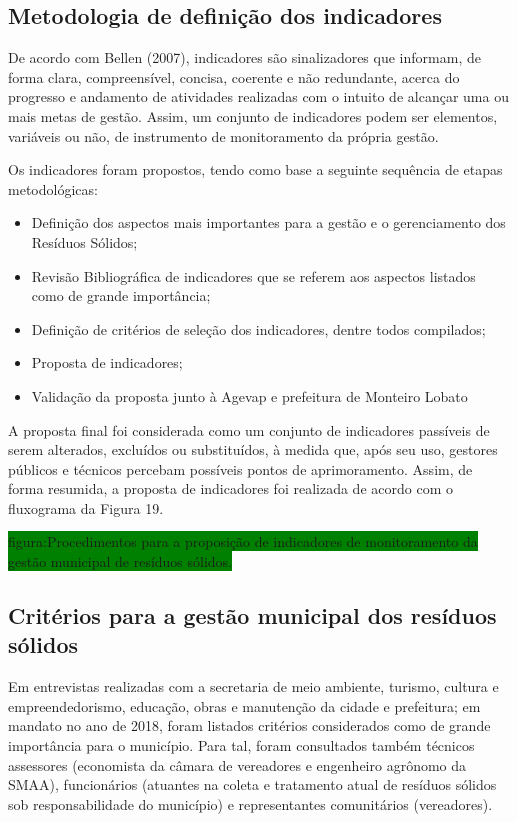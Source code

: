 	
	\subsection{Metodologia de definição dos indicadores}
	De acordo com Bellen (2007), indicadores são sinalizadores que informam, de forma clara, compreensível, concisa, coerente e não redundante, acerca do progresso e andamento de atividades realizadas com o intuito de alcançar uma ou mais metas de gestão. Assim, um conjunto de indicadores podem ser elementos, variáveis ou não, de instrumento de monitoramento da própria gestão.
	
	Os indicadores foram propostos, tendo como base a seguinte sequência de etapas metodológicas:
	
	\begin{itemize}
		\item Definição dos aspectos mais importantes para a gestão e o
		gerenciamento dos Resíduos Sólidos;
		\item Revisão Bibliográfica de indicadores que se referem aos aspectos
	listados como de grande importância;
		\item Definição de critérios de seleção dos indicadores, dentre todos
	compilados;
		\item Proposta de indicadores;
		\item Validação da proposta junto à Agevap e prefeitura de Monteiro
	Lobato
	\end{itemize} 

	A proposta final foi considerada como um conjunto de indicadores passíveis de serem alterados, excluídos ou substituídos, à medida que, após seu uso, gestores públicos e técnicos percebam possíveis pontos de aprimoramento. Assim, de forma resumida, a proposta de indicadores foi realizada de acordo com o fluxograma da Figura 19.
	
	\colorbox{green}{figura:Procedimentos para a proposição de indicadores de monitoramento da gestão municipal de resíduos sólidos.}
	
	\subsection{Critérios para a gestão municipal dos resíduos sólidos}
	
	Em entrevistas realizadas com a secretaria de meio ambiente, turismo, cultura e empreendedorismo, educação, obras e manutenção da cidade e prefeitura; em mandato no ano de 2018, foram listados critérios considerados como de grande importância para o município. Para tal, foram consultados também técnicos assessores (economista da câmara de vereadores e engenheiro agrônomo da SMAA), funcionários (atuantes na coleta e tratamento atual de resíduos sólidos sob responsabilidade do município) e representantes comunitários (vereadores).
	
